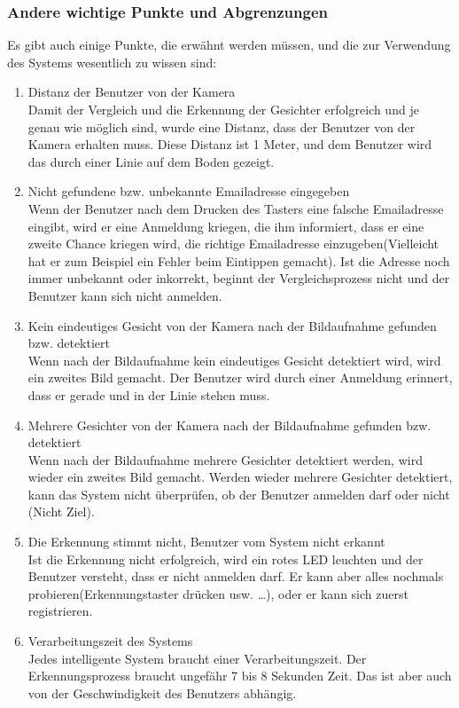 \subsubsection{Andere wichtige Punkte und Abgrenzungen}

Es gibt auch einige Punkte, die erwähnt werden müssen, und die zur Verwendung des Systems wesentlich zu wissen sind:

\begin{enumerate}
	\item Distanz der Benutzer von der Kamera \\
	
	Damit der Vergleich und die Erkennung der Gesichter erfolgreich und je genau wie möglich sind, wurde eine Distanz, dass der Benutzer von der Kamera erhalten muss. Diese Distanz ist 1 Meter, und dem Benutzer wird das durch einer Linie auf dem Boden gezeigt.
	\item Nicht gefundene bzw. unbekannte Emailadresse eingegeben \\
	
	Wenn der Benutzer nach dem Drucken des Tasters eine falsche Emailadresse eingibt, wird er eine Anmeldung kriegen, die ihm informiert, dass er eine zweite Chance kriegen wird, die richtige Emailadresse einzugeben(Vielleicht hat er zum Beispiel ein Fehler beim Eintippen gemacht). Ist die Adresse noch immer unbekannt oder inkorrekt, beginnt der Vergleichsprozess nicht und der Benutzer kann sich nicht anmelden.
	\item Kein eindeutiges Gesicht von der Kamera nach der Bildaufnahme gefunden bzw. detektiert \\
	
	Wenn nach der Bildaufnahme kein eindeutiges Gesicht detektiert wird, wird ein zweites Bild gemacht. Der Benutzer wird durch einer Anmeldung erinnert, dass er gerade und in der Linie stehen muss.
	\item Mehrere Gesichter von der Kamera nach der Bildaufnahme gefunden bzw. detektiert \\
	
	Wenn nach der Bildaufnahme mehrere Gesichter detektiert werden, wird wieder ein zweites Bild gemacht. Werden wieder mehrere Gesichter detektiert, kann das System nicht überprüfen, ob der Benutzer anmelden darf oder nicht (Nicht Ziel).
	\item Die Erkennung stimmt nicht, Benutzer vom System nicht erkannt \\
	
	Ist die Erkennung nicht erfolgreich, wird ein rotes LED leuchten und der Benutzer versteht, dass er nicht anmelden darf. Er kann aber alles nochmals probieren(Erkennungstaster drücken usw. …), oder er kann sich zuerst registrieren.
	\item Verarbeitungszeit des Systems \\
	
	Jedes intelligente System braucht einer Verarbeitungszeit. Der Erkennungsprozess braucht ungefähr 7 bis 8 Sekunden Zeit. Das ist aber auch von der Geschwindigkeit des Benutzers abhängig.
\end{enumerate}
